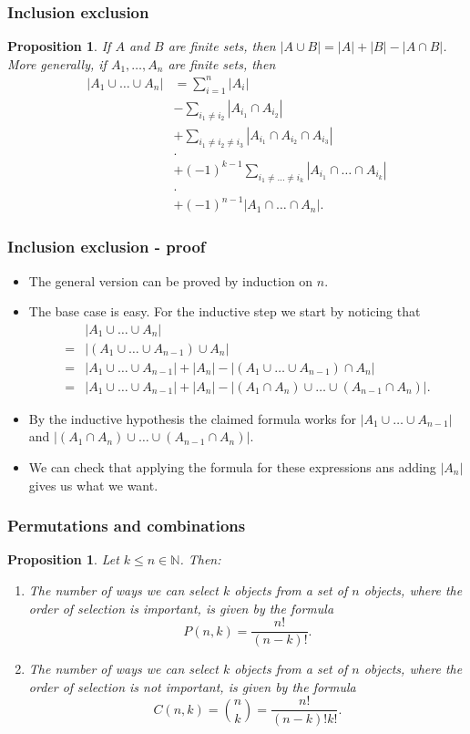 \documentclass[handout]{beamer}
\newtheorem{proposition}[theorem]{Proposition}
\newcommand{\bN}{\mathbb{N}}
\begin{document}
\begin{frame}
\frametitle{Inclusion exclusion}
\begin{proposition}
If $A$ and $B$ are finite sets, then $|A\cup B|=|A|+|B|-|A\cap B|$.
More generally, if $A_1,\ldots,A_n$ are finite sets, then
\begin{align*}|A_1\cup\ldots\cup A_n| & =\sum_{i=1}^n |A_i| \\
&- \sum _{i_1\neq i_2} |A_{i_1}\cap A_{i_2}| \\
&+ \sum_{i_1\neq i_2\neq i_3} |A_{i_1}\cap A_{i_2}\cap A_{i_3}|\\
&.\\
&+ (-1)^{k-1} \sum _{i_1\neq\ldots\neq i_k}|A_{i_1}\cap\ldots \cap A_{i_k}|\\
&.\\
&+(-1)^{n-1} |A_1\cap\ldots \cap A_n|.
\end{align*}
\end{proposition}
\end{frame}

\begin{frame}
\frametitle{Inclusion exclusion - proof}
\begin{itemize}
\item The general version can be proved by induction on $n$.
\item The base case is easy. For the inductive step we start by noticing that 
\begin{align*}
&|A_1\cup\ldots\cup A_n|\\ 
=& |(A_1\cup\ldots\cup A_{n-1})\cup A_n| \\
=& |A_1\cup\ldots\cup A_{n-1}| +|A_n| - |(A_1\cup\ldots\cup A_{n-1})\cap A_n |\\
=& |A_1\cup\ldots\cup A_{n-1}| +|A_n| - |(A_1\cap A_n)\cup\ldots\cup (A_{n-1}\cap A_n)|. 
\end{align*}
\item By the inductive hypothesis the claimed formula works for $|A_1\cup\ldots\cup A_{n-1}|$ and $|(A_1\cap A_n)\cup\ldots\cup (A_{n-1}\cap A_n)|$. 
\item We can check that applying the formula for these expressions ans adding $|A_n|$ gives us what we want.
\end{itemize}
\end{frame}

\begin{frame}
\frametitle{Permutations and combinations}
\begin{proposition}
Let $k\leq n\in\bN$. Then:
\begin{enumerate}
\item The number of ways we can select $k$ objects from a set of $n$ objects, where the order of selection is important, is given by the formula
\[P(n,k) = \frac{n!}{(n-k)!}.\]
\item The number of ways we can select $k$ objects from a set of $n$ objects, where the order of selection is \emph{not} important, is given by the formula
\[C(n,k) = {n \choose k} = \frac{n!}{(n-k)! k!}.\]
\end{enumerate}
\end{proposition}
\end{frame}
\end{document}
